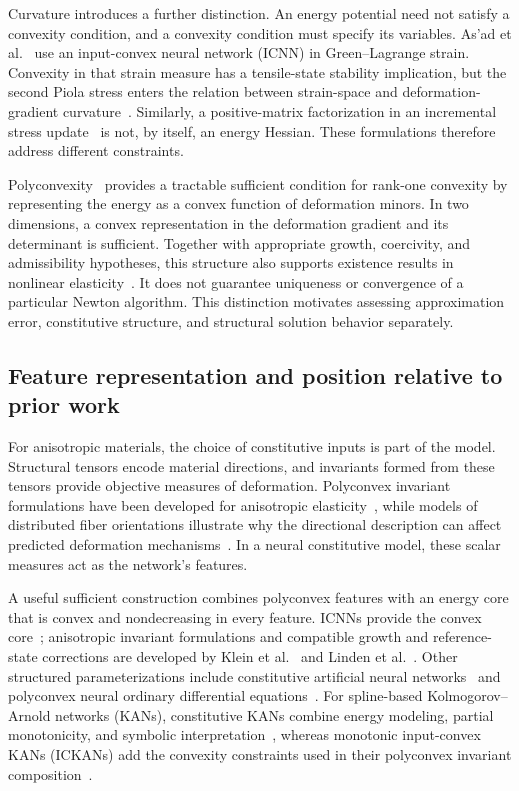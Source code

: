 Curvature introduces a further distinction. An energy potential need not satisfy a convexity condition, and a convexity condition must specify its variables. As'ad et al.~\cite{asad2022} use an input-convex neural network (ICNN) in Green--Lagrange strain. Convexity in that strain measure has a tensile-state stability implication, but the second Piola stress enters the relation between strain-space and deformation-gradient curvature~\cite{GaoNeffRoventaThiel2017}. Similarly, a positive-matrix factorization in an incremental stress update~\cite{Xu2021} is not, by itself, an energy Hessian. These formulations therefore address different constraints.

Polyconvexity~\cite{ball1977} provides a tractable sufficient condition for rank-one convexity by representing the energy as a convex function of deformation minors. In two dimensions, a convex representation in the deformation gradient and its determinant is sufficient. Together with appropriate growth, coercivity, and admissibility hypotheses, this structure also supports existence results in nonlinear elasticity~\cite{Ciarlet1988}. It does not guarantee uniqueness or convergence of a particular Newton algorithm. This distinction motivates assessing approximation error, constitutive structure, and structural solution behavior separately.

\subsection{Feature representation and position relative to prior work}
\label{sec:discussion}
For anisotropic materials, the choice of constitutive inputs is part of the model. Structural tensors encode material directions, and invariants formed from these tensors provide objective measures of deformation. Polyconvex invariant formulations have been developed for anisotropic elasticity~\cite{SchroderNeff2003}, while models of distributed fiber orientations illustrate why the directional description can affect predicted deformation mechanisms~\cite{Gasser2006}. In a neural constitutive model, these scalar measures act as the network's features.

A useful sufficient construction combines polyconvex features with an energy core that is convex and nondecreasing in every feature. ICNNs provide the convex core~\cite{amos2017}; anisotropic invariant formulations and compatible growth and reference-state corrections are developed by Klein et al.~\cite{klein2022} and Linden et al.~\cite{linden2023}. Other structured parameterizations include constitutive artificial neural networks~\cite{Linka2023} and polyconvex neural ordinary differential equations~\cite{Tac2022}. For spline-based Kolmogorov--Arnold networks (KANs), constitutive KANs combine energy modeling, partial monotonicity, and symbolic interpretation~\cite{Abdolazizi2025}, whereas monotonic input-convex KANs (ICKANs) add the convexity constraints used in their polyconvex invariant composition~\cite{thakolkaran2025}.

